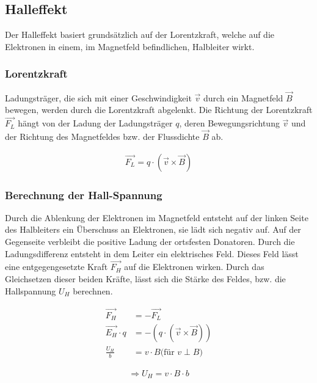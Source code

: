 \documentclass[a4paper]{scrartcl}
\numberwithin{equation}{subsection}
\begin{document}
\subsection{Halleffekt}
Der Halleffekt basiert grundsätzlich auf der Lorentzkraft, welche auf die Elektronen in einem, im Magnetfeld befindlichen, Halbleiter wirkt.

\subsubsection{Lorentzkraft}
Ladungsträger, die sich mit einer Geschwindigkeit $\overrightarrow{v}$ durch ein Magnetfeld $\overrightarrow{B}$ bewegen, werden durch die Lorentzkraft abgelenkt. 
Die Richtung der Lorentzkraft $\overrightarrow{F_L}$ hängt von der Ladung der Ladungsträger $q$, deren Bewegungsrichtung $\overrightarrow{v}$ und der Richtung des Magnetfeldes bzw. der Flussdichte $\overrightarrow{B}$ ab. \cite{anl}

\begin{align}
\overrightarrow{F_L} = q \cdot (\overrightarrow{v} \times \overrightarrow{B})
\end{align}

\subsubsection{Berechnung der Hall-Spannung}

Durch die Ablenkung der Elektronen im Magnetfeld entsteht auf der linken Seite des Halbleiters ein Überschuss an Elektronen, sie lädt sich negativ auf. Auf der Gegenseite verbleibt die positive Ladung der ortsfesten Donatoren. Durch die Ladungsdifferenz entsteht in dem Leiter ein elektrisches Feld. Dieses Feld lässt eine entgegengesetzte Kraft $\overrightarrow{F_H}$ auf die Elektronen wirken. Durch das Gleichsetzen dieser beiden Kräfte, lässt sich die Stärke des Feldes, bzw. die Hallspannung $U_H$ berechnen. \cite{anl}

\begin{align}
\overrightarrow{F_H} &= -\overrightarrow{F_L} \\
\overrightarrow{E_H} \cdot q &= -(q \cdot (\overrightarrow{v} \times \overrightarrow{B})) \\
\frac{U_H}{b} &= v \cdot B \text{(für $v \perp B$)}
\end{align}

\begin{align}
\Rightarrow U_H = v \cdot B \cdot b
\end{align}
\end{document}
